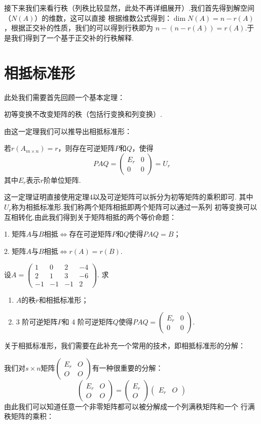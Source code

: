 接下来我们来看行秩（列秩比较显然，此处不再详细展开）.我们首先得到解空间（$N(A)$）的维数，这可以直接
根据维数公式得到：$\dim N(A) =n-r(A)$，根据正交补的性质，我们的可以得到行秩即为
$n-(n-r(A))=r(A)$.于是我们得到了一个基于正交补的行秩解释.

\section{相抵标准形}
此处我们需要首先回顾一个基本定理：
\begin{theorem}
    初等变换不改变矩阵的秩（包括行变换和列变换）.
\end{theorem}
由这一定理我们可以推导出相抵标准形：
\begin{theorem}
    若$r(A_{m \times n})=r$，则存在可逆矩阵$P$和$Q$，使得
    \[PAQ=\begin{pmatrix}
        E_r & 0 \\ 0 & 0
    \end{pmatrix}=U_r\]
    其中$E_r$表示$r$阶单位矩阵.
\end{theorem}
这一定理证明直接使用定理4以及可逆矩阵可以拆分为初等矩阵的乘积即可.
其中$U_r$称为相抵标准形.我们称两个矩阵相抵即两个矩阵可以通过一系列
初等变换可以互相转化.由此我们得到关于矩阵相抵的两个等价命题：

1. 矩阵$A$与$B$相抵$\iff$存在可逆矩阵$P$和$Q$使得$PAQ=B$；

2. 矩阵$A$与$B$相抵$\iff r(A)=r(B)$.

\begin{example}
    设$A=\begin{pmatrix}
        1 & 0 & 2 & -4 \\ 2 & 1 & 3 & -6 \\ -1 & -1 & -1 & 2
    \end{pmatrix}$. 求
    \begin{enumerate}
        \item $A$的秩$r$和相抵标准形；

        \item 3 阶可逆矩阵$P$和 4 阶可逆矩阵$Q$使得$PAQ=\begin{pmatrix}
            E_r & 0 \\ 0 & 0
        \end{pmatrix}$.
    \end{enumerate}
\end{example}

关于相抵标准形，我们需要在此补充一个常用的技术，即相抵标准形的分解：

我们对$s \times n$矩阵$\begin{pmatrix}
    E_r & O \\ O & O
\end{pmatrix}$有一种很重要的分解：
\[\begin{pmatrix}
    E_r & O \\ O & O
\end{pmatrix}=\begin{pmatrix}
    E_r \\ O
\end{pmatrix}\begin{pmatrix}
    E_r & O
\end{pmatrix}\]
由此我们可以知道任意一个非零矩阵都可以被分解成一个列满秩矩阵和一个
行满秩矩阵的乘积：

